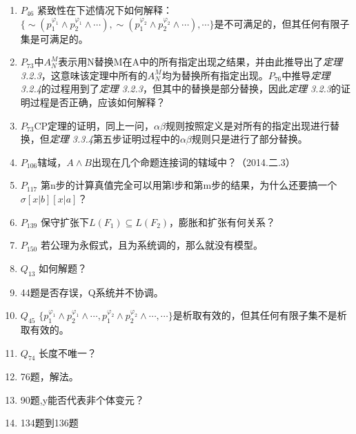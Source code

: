 \documentclass[a4paper]{ctexart}
\newcommand{\blankspace}[1]{\vskip #1\baselineskip}
\begin{document}
\begin{enumerate}
  
  \item $P_{46}$ 紧致性在下述情况下如何解释：
  $\{\sim(p_1^{\varphi_1}\wedge p_2^{\varphi_1}\wedge\cdots),\sim(p_1^{\varphi_2}\wedge p_2^{\varphi_2}\wedge\cdots),\cdots\}$是不可满足的，但其任何有限子集是可满足的。

  \item $P_{73}$中$A_N^M$表示用N替换M在A中的所有指定出现之结果，并由此推导出了\textit{定理 3.2.3}，这意味该定理中所有的$A_N^M$均为替换所有指定出现。$P_{76}$中推导\textit{定理 3.2.4}的过程用到了\textit{定理 3.2.3}，但其中的替换是部分替换，因此\textit{定理 3.2.3}的证明过程是否正确，应该如何解释？
  
  \item $P_{73}$CP定理的证明，同上一问，$\alpha\beta$规则按照定义是对所有的指定出现进行替换，但\textit{定理 3.3.4}第五步证明过程中的$\alpha\beta$规则只是进行了部分替换。
  
  \item $P_{106}$辖域，$A\wedge B$出现在几个命题连接词的辖域中？（2014.二.3）
  
  \item $P_{117}$ 第n步的计算真值完全可以用第l步和第m步的结果，为什么还要搞一个$\sigma[x|b][x|a]$？
  
  \item $P_{139}$ 保守扩张下$L(F_1)\subseteq L(F_2)$，膨胀和扩张有何关系？
  
  \item $P_{150}$ 若公理为永假式，且为系统调的，那么就没有模型。
  
  
  \blankspace{3}
  \item $Q_{13}$ 如何解题？   
  
  \item 44题是否存误，Q系统并不协调。
  
  \item $Q_{45}$ $\{p_1^{\varphi_1}\wedge p_2^{\varphi_1}\wedge\cdots,p_1^{\varphi_2}\wedge p_2^{\varphi_2}\wedge\cdots,\cdots\}$是析取有效的，但其任何有限子集不是析取有效的。
   
  \item $Q_{74}$ 长度不唯一？
  
  \item 76题，解法。
   
  \item 90题,y能否代表非个体变元？ 
  
  \item 134题到136题
   

\end{enumerate}
\end{document}

